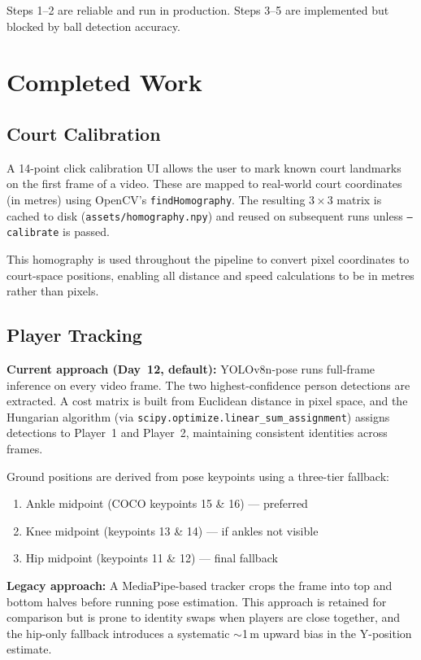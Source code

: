 \documentclass[12pt,a4paper]{article}
\begin{document}
Steps 1--2 are reliable and run in production. Steps 3--5 are implemented but blocked by ball detection accuracy.

\section{Completed Work}

\subsection{Court Calibration}

A 14-point click calibration UI allows the user to mark known court landmarks on the first frame of a video. These are mapped to real-world court coordinates (in metres) using OpenCV's \texttt{findHomography}. The resulting $3\times3$ matrix is cached to disk (\texttt{assets/homography.npy}) and reused on subsequent runs unless \texttt{--calibrate} is passed.

This homography is used throughout the pipeline to convert pixel coordinates to court-space positions, enabling all distance and speed calculations to be in metres rather than pixels.

\subsection{Player Tracking}

\textbf{Current approach (Day~12, default):} YOLOv8n-pose runs full-frame inference on every video frame. The two highest-confidence person detections are extracted. A cost matrix is built from Euclidean distance in pixel space, and the Hungarian algorithm (via \texttt{scipy.optimize.linear\_sum\_assignment}) assigns detections to Player~1 and Player~2, maintaining consistent identities across frames.

Ground positions are derived from pose keypoints using a three-tier fallback:
\begin{enumerate}
    \item Ankle midpoint (COCO keypoints 15 \& 16) — preferred
    \item Knee midpoint (keypoints 13 \& 14) — if ankles not visible
    \item Hip midpoint (keypoints 11 \& 12) — final fallback
\end{enumerate}

\textbf{Legacy approach:} A MediaPipe-based tracker crops the frame into top and bottom halves before running pose estimation. This approach is retained for comparison but is prone to identity swaps when players are close together, and the hip-only fallback introduces a systematic $\sim$1\,m upward bias in the Y-position estimate.
\end{document}
